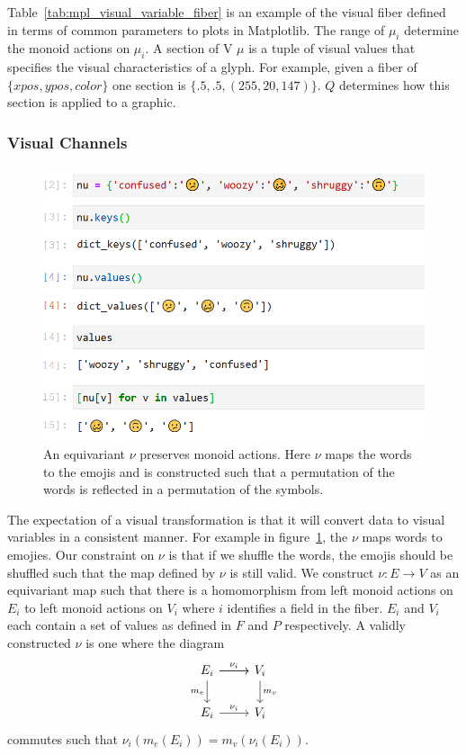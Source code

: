 \documentclass[../main.tex]{subfiles}
\begin{document}
Table~\ref{tab:mpl_visual_variable_fiber} is an example of the visual fiber defined in terms of common parameters to plots in Matplotlib. The range of $\mu_{i}$ determine the monoid actions on $\mu_{i}$. A section of V $\mu$ is a tuple of visual values that specifies the visual characteristics of a glyph. For example, given a fiber of $\{xpos, ypos, color\}$ one section is $\{.5, .5, (255, 20,147)\}$. $Q$ determines how this section is applied to a graphic.  

\subsubsection{Visual Channels}
\label{sec:artist_nu}
\begin{figure}[H]
    \includegraphics[width=\textwidth]{figures/math/equivariance_nu.png}
    \caption{An equivariant $\nu$ preserves monoid actions. Here $\nu$ maps the words to the emojis and is constructed such that a permutation of the words is reflected in a permutation of the symbols. }
    \label{fig:artist_nu}
\end{figure}
The expectation of a visual transformation is that it will convert data to visual variables in a consistent manner. For example in figure~\ref{fig:artist_nu}, the $\nu$ maps words to emojies. Our constraint on $\nu$ is that if we shuffle the words, the emojis should be shuffled such that the map defined by $\nu$ is still valid. We construct $\nu: E \rightarrow V$ as an equivariant map such that there is a homomorphism from left monoid actions on $E_{i}$ to left monoid actions on $V_{i}$ where $i$ identifies a field in the fiber. $E_i$ and $V_{i}$ each contain a set of values as defined in $F$ and $P$ respectively. A validly constructed $\nu$ is one where the  diagram 
\begin{equation}
    \label{eq:nu_categorical}
\begin{tikzcd}
    E_i \arrow[r] \arrow[r, "\nu_i"] \arrow[d, "m_e"'] & V_i \arrow[d, "m_v"] \\
    E_i \arrow[r, "\nu_i"]                           & V_i               
\end{tikzcd}
\end{equation}
commutes such that $\nu_i(m_e(E_i)) = m_v(\nu_i(E_i))$.
\end{document}
